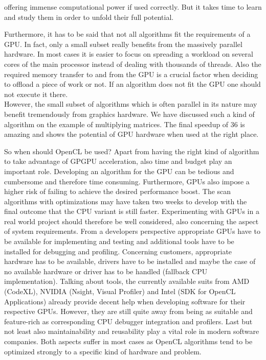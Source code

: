 offering immense computational power if used correctly. But it takes time to learn and study them in order to unfold their full potential.

Furthermore, it has to be said that not all algorithms fit the requirements of a GPU. In fact, only a small subset really benefits from the massively parallel hardware. In most cases it is easier to focus on spreading a workload on several cores of the main processor instead of dealing with thousands of threads. Also the required memory transfer to and from the GPU is a crucial factor when deciding to offload a piece of work or not. If an algorithm does not fit the GPU one should not execute it there. \\
However, the small subset of algorithms which is often parallel in its nature may benefit tremendously from graphics hardware. We have discussed such a kind of algorithm on the example of multiplying matrices. The final speedup of 36 is amazing and shows the potential of GPU hardware when used at the right place.

So when should OpenCL be used? Apart from having the right kind of algorithm to take advantage of GPGPU acceleration, also time and budget play an important role. Developing an algorithm for the GPU can be tedious and cumbersome and therefore time consuming. Furthermore, GPUs also impose a higher risk of failing to achieve the desired performance boost. The scan algorithms with optimizations may have taken two weeks to develop with the final outcome that the CPU variant is still faster. Experimenting with GPUs in a real world project should therefore be well considered, also concerning the aspect of system requirements. From a developers perspective appropriate GPUs have to be available for implementing and testing and additional tools have to be installed for debugging and profiling. Concerning customers, appropriate hardware has to be available, drivers have to be installed and maybe the case of no available hardware or driver has to be handled (fallback CPU implementation). Talking about tools, the currently available suits from AMD (CodeXL), NVIDIA (Nsight, Visual Profiler) and Intel (SDK for OpenCL Applications) already provide decent help when developing software for their respective GPUs. However, they are still quite away from being as suitable and feature-rich as corresponding CPU debugger integration and profilers. Last but not least also maintainability and reusability play a vital role in modern software companies. Both aspects suffer in most cases as OpenCL algorithms tend to be optimized strongly to a specific kind of hardware and problem.

